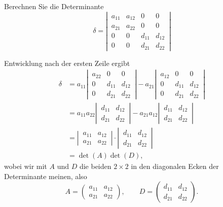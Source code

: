 Berechnen Sie die Determinante
\[
\delta=\left|\,
\begin{matrix}
a_{11}&a_{12}&0     &0     \\
a_{21}&a_{22}&0     &0     \\
0     &0     &d_{11}&d_{12}\\
0     &0     &d_{21}&d_{22}
\end{matrix}
\,\right|
\]

\begin{loesung}
Entwicklung nach der ersten Zeile ergibt
\begin{align*}
\delta
&=
a_{11}\left|\,
\begin{matrix}
a_{22}&0     &0     \\
0     &d_{11}&d_{12}\\
0     &d_{21}&d_{22}
\end{matrix}
\,\right|
-
a_{21}
\left|\,
\begin{matrix}
a_{12}&0     &0     \\
0     &d_{11}&d_{12}\\
0     &d_{21}&d_{22}
\end{matrix}
\,\right|
\\
&=
a_{11}a_{22}\left|\,
\begin{matrix}
d_{11}&d_{12}\\
d_{21}&d_{22}
\end{matrix}
\,\right|
-
a_{21}a_{12}
\left|\,
\begin{matrix}
d_{11}&d_{12}\\
d_{21}&d_{22}
\end{matrix}
\,\right|
\\
&=
\left|\,
\begin{matrix}
a_{11}&a_{12}\\
a_{21}&a_{22}
\end{matrix}
\,\right|
\cdot
\left|\,
\begin{matrix}
d_{11}&d_{12}\\
d_{21}&d_{22}
\end{matrix}
\,\right|
\\
&=\det(A)\det(D),
\end{align*}
wobei wir mit $A$ und $D$ die beiden $2\times 2$ in den diagonalen Ecken
der Determinante meinen, also
\[
A=\begin{pmatrix}
a_{11}&a_{12}\\a_{21}&a_{22}
\end{pmatrix},\qquad
D=\begin{pmatrix}
d_{11}&d_{12}\\d_{21}&d_{22}
\end{pmatrix}.
\]
\end{loesung}


